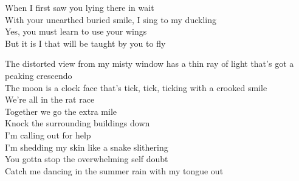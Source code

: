 
When I first saw you lying there in wait \\
With your unearthed buried smile, I sing to my duckling \\
Yes, you must learn to use your wings \\
But it is I that will be taught by you to fly \\


The distorted view from my misty window has a thin ray of light that's got a peaking crescendo \\
The moon is a clock face that's tick, tick, ticking with a crooked smile \\
We're all in the rat race \\
Together we go the extra mile \\

Knock the surrounding buildings down \\
I'm calling out for help \\
I'm shedding my skin like a snake slithering \\
You gotta stop the overwhelming self doubt \\
Catch me dancing in the summer rain with my tongue out \\
